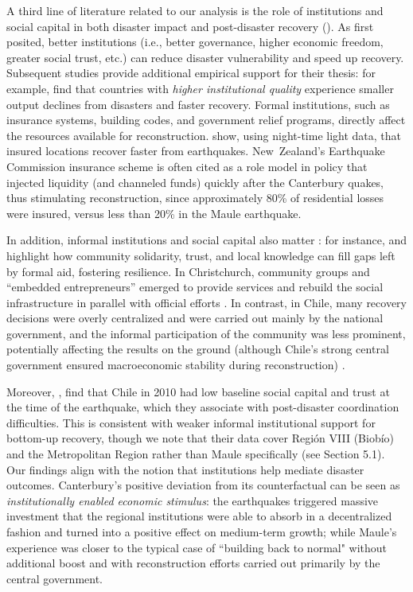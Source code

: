 \documentclass[12pt]{article}
\begin{document}
A third line of literature related to our analysis is the role of institutions and social capital in both disaster impact and post-disaster recovery (\cite{rayamajhee2024shock, storr2016community, dussaillant2014trust}). As \textcite{skidmore2002does} first posited, better institutions (i.e., better governance, higher economic freedom, greater social trust, etc.) can reduce disaster vulnerability and speed up recovery. Subsequent studies provide additional empirical support for their thesis: for example, \textcite{raschky2008institutions, barone2014natural} find that countries with \textit{higher institutional quality} experience smaller output declines from disasters and faster recovery. Formal institutions, such as insurance systems, building codes, and government relief programs, directly affect the resources available for reconstruction. \textcite{nguyen2020insurance} show, using night-time light data, that insured locations recover faster from earthquakes. New Zealand’s Earthquake Commission insurance scheme is often cited as a role model in policy that injected liquidity (and channeled funds) quickly after the Canterbury quakes, thus stimulating reconstruction, since approximately 80\% of residential losses were insured, versus less than 20\% in the Maule earthquake. 

In addition, informal institutions and social capital also matter \parencite{storr2016community}: for instance, \textcite{storr2017sandy} and \textcite{aldrich2015social} highlight how community solidarity, trust, and local knowledge can fill gaps left by formal aid, fostering resilience. In Christchurch, community groups and “embedded entrepreneurs” emerged to provide services and rebuild the social infrastructure in parallel with official efforts \autocite{grube2018embedded}. In contrast, in Chile, many recovery decisions were overly centralized and were carried out mainly by the national government, and the informal participation of the community was less prominent, potentially affecting the results on the ground (although Chile's strong central government ensured macroeconomic stability during reconstruction) \parencite{cardenasjiron2012chilean}. 

Moreover, \textcite{dussaillant2014trust}, find that Chile in 2010 had low baseline social capital and trust at the time of the earthquake, which they associate with post-disaster coordination difficulties. This is consistent with weaker informal institutional support for bottom-up recovery, though we note that their data cover Región VIII (Biobío) and the Metropolitan Region rather than Maule specifically (see Section 5.1). Our findings align with the notion that institutions help mediate disaster outcomes. Canterbury’s positive deviation from its counterfactual can be seen as \emph{institutionally enabled economic stimulus}: the earthquakes triggered massive investment that the regional institutions were able to absorb in a decentralized fashion and turned into a positive effect on medium-term growth; while Maule's experience was closer to the typical case of “building back to normal" without additional boost and with reconstruction efforts carried out primarily by the central government.
\end{document}
